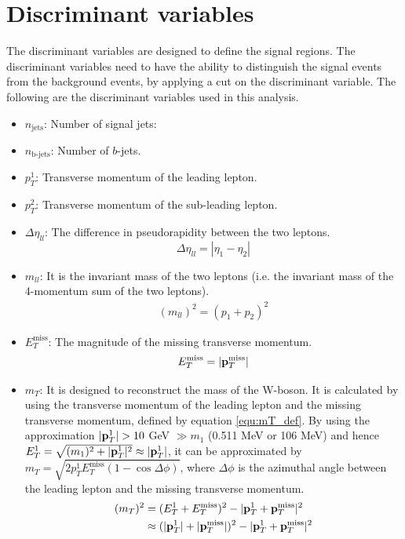 \section{Discriminant variables}
The discriminant variables are designed to define the signal regions.
The discriminant variables need to have the ability to distinguish the signal events from the background events, by applying a cut on the discriminant variable.
The following are the discriminant variables used in this analysis.
\begin{itemize}
\item $n_{\text{jets}}$: Number of signal jets:
\item $n_{\text{b-jets}}$: Number of $b$-jets.
\item $p_T^1$: Transverse momentum of the leading lepton.
\item $p_T^2$: Transverse momentum of the sub-leading lepton.
\item $\Delta \eta_{ll}$:
The difference in pseudorapidity between the two leptons.
\begin{equation}
\Delta \eta_{ll} = |\eta_{1} - \eta_{2}|
\end{equation}
\item $m_{ll}$:
It is the invariant mass of the two leptons (i.e. the invariant mass of the 4-momentum sum of the two leptons).
\begin{align}
(m_{ll})^2 = (p_1 + p_2)^2
\end{align}
\item $E_{T}^{\text{miss}}$:
The magnitude of the missing transverse momentum.
\begin{equation}
E_{T}^{\text{miss}} = |{\bf p}_T^{\text{miss}}|
\end{equation}
\item $m_T$:
It is designed to reconstruct the mass of the W-boson.
It is calculated by using the transverse momentum of the leading lepton and the missing transverse momentum, defined by equation \ref{equ:mT_def}.
By using the approximation $|{\bf p}_T^1| > 10$ GeV $\gg m_1$ (0.511 MeV or 106 MeV) and hence $E_T^1 = \sqrt{ (m_1)^2 + |{\bf p}_T^1|^2 } \approx |{\bf p}_T^1| $, it can be approximated by $m_T = \sqrt{2p_T^1 E_T^{\text{miss}}(1-\cos{\Delta\phi})}$, where $\Delta\phi$ is the azimuthal angle between the leading lepton and the missing transverse momentum.
\begin{align}
(m_T)^2 &= ( E_T^1 + E_T^{\text{miss}} )^2 - |{\bf p}_T^1 + {\bf p}_T^{\text{miss}}|^2 \label{equ:mT_def}\\
& \approx (|{\bf p}_T^1| + |{\bf p}_T^{\text{miss}}|)^2 - |{\bf p}_T^1 + {\bf p}_T^{\text{miss}}|^2 \\

\end{align}
\end{itemize}
